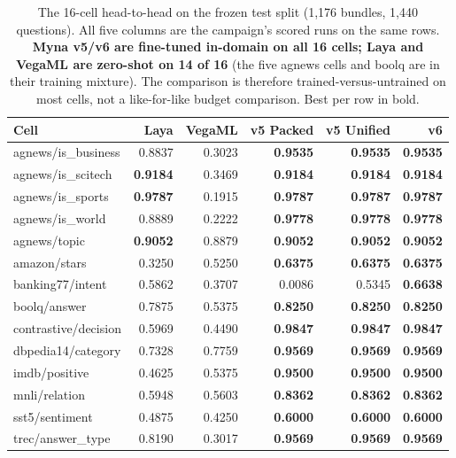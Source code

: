 \begin{table}[t]
\centering
\small
\setlength{\tabcolsep}{4.5pt}
\caption{The 16-cell head-to-head on the frozen test split (1{,}176 bundles,
1{,}440 questions). All five columns are the campaign's scored runs on the same
rows. \textbf{Myna v5/v6 are fine-tuned in-domain on all 16 cells; Laya and
VegaML are zero-shot on 14 of 16} (the five agnews cells and boolq are in their
training mixture). The comparison is therefore trained-versus-untrained on most
cells, not a like-for-like budget comparison. Best per row in bold.}
\label{tab:main}
\begin{tabular}{lrrrrr}
\toprule
Cell & Laya & VegaML & v5 Packed & v5 Unified & v6 \\
\midrule
agnews/is\_business & 0.8837 & 0.3023 & \textbf{0.9535} & \textbf{0.9535} & \textbf{0.9535} \\
agnews/is\_scitech & \textbf{0.9184} & 0.3469 & \textbf{0.9184} & \textbf{0.9184} & \textbf{0.9184} \\
agnews/is\_sports & \textbf{0.9787} & 0.1915 & \textbf{0.9787} & \textbf{0.9787} & \textbf{0.9787} \\
agnews/is\_world & 0.8889 & 0.2222 & \textbf{0.9778} & \textbf{0.9778} & \textbf{0.9778} \\
agnews/topic & \textbf{0.9052} & 0.8879 & \textbf{0.9052} & \textbf{0.9052} & \textbf{0.9052} \\
amazon/stars & 0.3250 & 0.5250 & \textbf{0.6375} & \textbf{0.6375} & \textbf{0.6375} \\
banking77/intent & 0.5862 & 0.3707 & 0.0086 & 0.5345 & \textbf{0.6638} \\
boolq/answer & 0.7875 & 0.5375 & \textbf{0.8250} & \textbf{0.8250} & \textbf{0.8250} \\
contrastive/decision & 0.5969 & 0.4490 & \textbf{0.9847} & \textbf{0.9847} & \textbf{0.9847} \\
dbpedia14/category & 0.7328 & 0.7759 & \textbf{0.9569} & \textbf{0.9569} & \textbf{0.9569} \\
imdb/positive & 0.4625 & 0.5375 & \textbf{0.9500} & \textbf{0.9500} & \textbf{0.9500} \\
mnli/relation & 0.5948 & 0.5603 & \textbf{0.8362} & \textbf{0.8362} & \textbf{0.8362} \\
sst5/sentiment & 0.4875 & 0.4250 & \textbf{0.6000} & \textbf{0.6000} & \textbf{0.6000} \\
trec/answer\_type & 0.8190 & 0.3017 & \textbf{0.9569} & \textbf{0.9569} & \textbf{0.9569} \\

\end{tabular}
\end{table}
